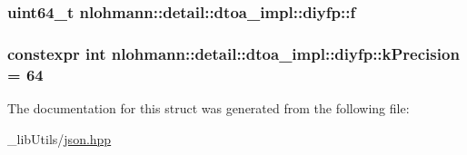 \subsubsection[{\texorpdfstring{f}{f}}]{\setlength{\rightskip}{0pt plus 5cm}uint64\+\_\+t nlohmann\+::detail\+::dtoa\+\_\+impl\+::diyfp\+::f}\hypertarget{structnlohmann_1_1detail_1_1dtoa__impl_1_1diyfp_a90f04c892ac1e707fdb50b0e1eb59030}{}\label{structnlohmann_1_1detail_1_1dtoa__impl_1_1diyfp_a90f04c892ac1e707fdb50b0e1eb59030}
\subsubsection[{\texorpdfstring{k\+Precision}{kPrecision}}]{\setlength{\rightskip}{0pt plus 5cm}constexpr int nlohmann\+::detail\+::dtoa\+\_\+impl\+::diyfp\+::k\+Precision = 64\hspace{0.3cm}{\ttfamily [static]}}\hypertarget{structnlohmann_1_1detail_1_1dtoa__impl_1_1diyfp_a03682754b06ed4f30b263119eecc2d52}{}\label{structnlohmann_1_1detail_1_1dtoa__impl_1_1diyfp_a03682754b06ed4f30b263119eecc2d52}


The documentation for this struct was generated from the following file\+:\begin{DoxyCompactItemize}
\item 
\+\_\+lib\+Utils/\hyperlink{json_8hpp}{json.\+hpp}\end{DoxyCompactItemize}

